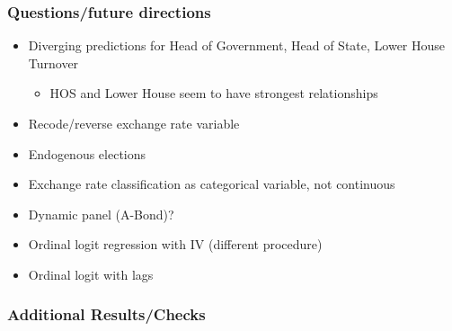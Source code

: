 \documentclass[]{beamer}
\begin{document}
\begin{frame}
\frametitle{Questions/future directions}
\begin{itemize}
\item Diverging predictions for Head of Government, Head of State, Lower House Turnover
\begin{itemize}
\item HOS and Lower House seem to have strongest relationships
\end{itemize}
\item Recode/reverse exchange rate variable
\item Endogenous elections
\item Exchange rate classification as categorical variable, not continuous
\item Dynamic panel (A-Bond)?
\item Ordinal logit regression with IV (different procedure)
\item Ordinal logit with lags
\end{itemize}
\end{frame}


\begin{frame}
\frametitle{Additional Results/Checks}
\end{frame}
\end{document}
